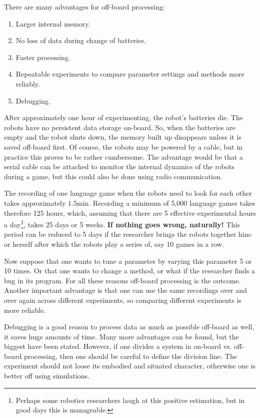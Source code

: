 There are many advantages for off-board processing:

\begin{enumerate}
\item Larger internal memory.
\item No loss of data during change of batteries.
\item Faster processing.
\item Repeatable experiments to compare parameter settings and methods more reliably.
\item Debugging.
\end{enumerate}


After approximately one hour of experimenting, the robot's batteries die. The robots have no persistent data storage on-board. So, when the batteries are empty and the robot shuts down, the memory built up disappears unless it is saved off-board first. Of course, the robots may be powered by a cable, but in practice this proves to be rather cumbersome. The advantage would be that a serial cable can be attached to monitor the internal dynamics of the robots during a game, but this could also be done using radio communication.

The recording of one language game when the robots need to look for each other takes approximately $1.5 \mbox{min}$. Recording a minimum of 5,000 language games takes therefore 125 hours, which, assuming that there are 5 effective experimental hours a day\footnote{Perhaps some robotics researchers laugh at this positive estimation, but in good days this is manageable.}, takes 25 days or 5 weeks. {\bf If nothing goes wrong, naturally!} This period can be reduced to 5 days if the researcher brings the robots together him- or herself after which the robots play a series of, say 10 games in a row. 

Now suppose that one wants to tune a parameter by varying this parameter 5 or 10 times. Or that one wants to change a method, or what if the researcher finds a bug in its program. For all these reasons off-board processing is the outcome. Another important advantage is that one can use the same recordings over and over again across different experiments, so comparing different experiments is more reliable.


Debugging is a good reason to process data as much as possible off-board as well, it saves huge amounts of time. Many more advantages can be found, but the biggest have been stated. However, if one divides a system in on-board vs. off-board processing, then one should be careful to define the division line. The experiment should not loose its embodied and situated character, otherwise one is better off using simulations.


